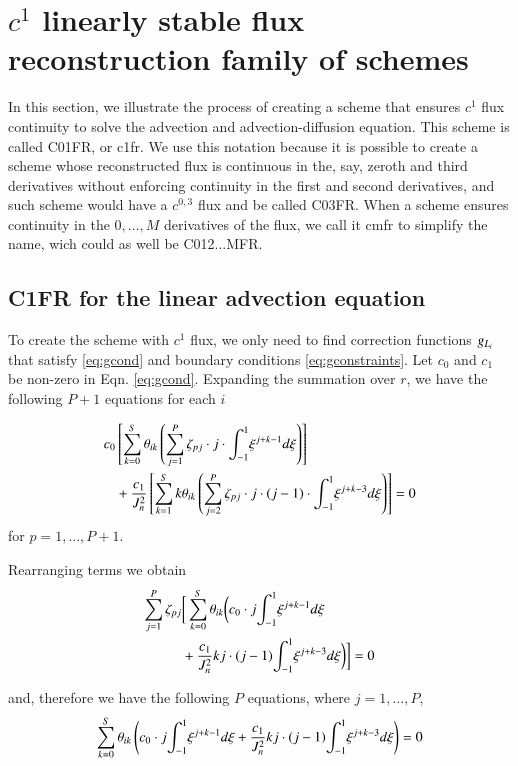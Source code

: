 \section{$c^{1}$ linearly stable flux reconstruction family of schemes}
In this section, we illustrate the process of creating a scheme that ensures $c^{1}$
flux continuity to solve the advection and advection-diffusion equation. This scheme is called C01FR, or \gls{c1fr}. We use this notation because it is possible to create a scheme whose reconstructed flux is continuous in the, say, zeroth and third derivatives without enforcing continuity in the first and second derivatives, and such scheme would have a $c^{0,3}$ flux and be called C03FR. When a scheme ensures continuity in the $0,\dots,M$ derivatives of the flux, we call it \gls{cmfr} to simplify the name, wich could as well be C012...MFR.

\subsection{C1FR for the linear advection equation}
To create the scheme with $c^{1}$ flux, we only need to find correction functions ${g_{L_i}}$ that satisfy \eqref{eq:gcond} and boundary conditions \eqref{eq:gconstraints}.
Let $c_0$ and $c_1$ be non-zero in Eqn. \eqref{eq:gcond}. Expanding the summation over $r$, we have the following $P+1$ equations for each $i$

\begin{equation}
\begin{split}
c_0 &\left[ \sum^S_{k=0} \theta_{ik}\left( \sum^P_{j=1}\zeta_{pj}\cdot j\cdot {\int^1_{-1}}  \xi^{j+k-1}d\xi \right) \right] \\
&+ 
\frac{c_1}{J^2_n} \left[ \sum^S_{k=1} k \theta_{ik} \left( \sum^P_{j=2}\zeta_{pj}\cdot j\cdot (j-1)\cdot {\int^1_{-1}}  \xi^{j+k-3}d\xi \right) \right]
 = 0
 \end{split}
\end{equation}
for $p = 1,...,P+1$.

Rearranging terms we obtain
\begin{equation}
\begin{split}
\sum^P_{j=1} \zeta_{pj} &\bigg[ \sum^S_{k=0} \theta_{ik}\bigg( c_0\cdot  j {\int^1_{-1}}  \xi^{j+k-1}d\xi  \\
&+ \frac{c_1}{J^2_n} k j\cdot (j-1)  {\int^1_{-1}}  \xi^{j+k-3}d\xi \bigg) \bigg]
 = 0
 \end{split}
\end{equation}

and, therefore we have the following $P$ equations, where $j = 1,\dots,P$,
\begin{equation}
\label{eqn:system}
\sum^S_{k=0} \theta_{ik}\left( c_0\cdot  j {\int^1_{-1}}  \xi^{j+k-1}d\xi  + \frac{c_1}{J^2_n} k j\cdot (j-1)  {\int^1_{-1}}  \xi^{j+k-3}d\xi \right) = 0
\end{equation}

